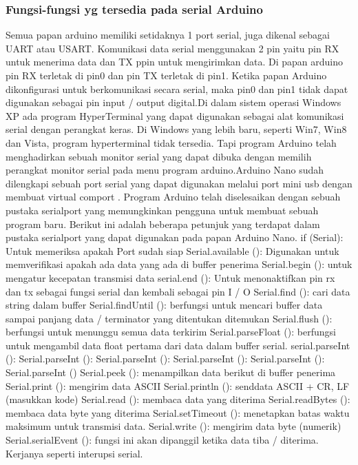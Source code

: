 \subsubsection {Fungsi-fungsi yg tersedia pada serial Arduino}
Semua papan arduino memiliki setidaknya 1 port serial, juga dikenal sebagai UART atau USART. Komunikasi data serial menggunakan 2 pin yaitu pin RX untuk menerima data dan TX ppin untuk mengirimkan data. Di papan arduino pin RX terletak di pin0 dan pin TX terletak di pin1. Ketika papan Arduino dikonfigurasi untuk berkomunikasi secara serial, maka pin0 dan pin1 tidak dapat digunakan sebagai pin input / output digital.Di dalam sistem operasi Windows XP ada program HyperTerminal yang dapat digunakan sebagai alat komunikasi serial dengan perangkat keras. Di Windows yang lebih baru, seperti Win7, Win8 dan Vista, program hyperterminal tidak tersedia. Tapi  program Arduino telah menghadirkan sebuah monitor serial yang dapat dibuka dengan memilih perangkat monitor serial pada menu program arduino.Arduino Nano sudah dilengkapi sebuah port serial yang dapat digunakan melalui port mini usb dengan membuat virtual comport .
Program Arduino telah diselesaikan dengan sebuah pustaka serialport yang memungkinkan pengguna untuk membuat sebuah program baru. Berikut ini adalah beberapa petunjuk yang terdapat dalam pustaka serialport yang dapat digunakan pada papan Arduino Nano.
if (Serial): Untuk memeriksa apakah Port sudah siap
Serial.available (): Digunakan untuk memverifikasi apakah ada data yang ada di buffer penerima
Serial.begin (): untuk mengatur kecepatan transmisi data
serial.end (): Untuk menonaktifkan pin rx dan tx sebagai fungsi serial dan kembali sebagai pin I / O
Serial.find (): cari data string dalam buffer
Serial.findUntil (): berfungsi untuk mencari buffer data sampai panjang data / terminator yang ditentukan ditemukan
Serial.flush (): berfungsi untuk menunggu semua data terkirim
Serial.parseFloat (): berfungsi untuk mengambil data float pertama dari data dalam buffer serial.
serial.parseInt (): Serial.parseInt (): Serial.parseInt (): Serial.parseInt (): Serial.parseInt (): Serial.parseInt ()
Serial.peek (): menampilkan data berikut di buffer penerima
Serial.print (): mengirim data ASCII
Serial.println (): senddata ASCII + CR, LF (masukkan kode)
Serial.read (): membaca data yang diterima
Serial.readBytes (): membaca data byte yang diterima
Serial.setTimeout (): menetapkan batas waktu maksimum untuk transmisi data.
Serial.write (): mengirim data byte (numerik)
Serial.serialEvent (): fungsi ini akan dipanggil ketika data tiba / diterima. Kerjanya seperti interupsi serial.

